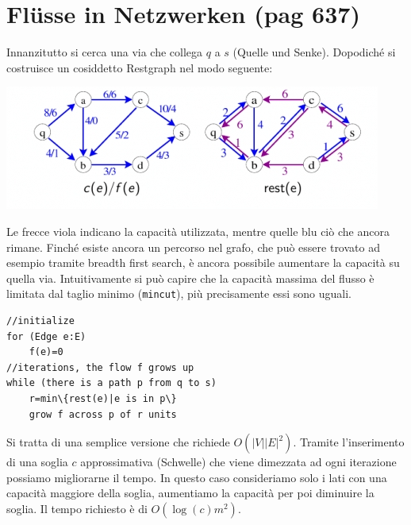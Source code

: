 \documentclass[a4paper]{book}
\newcommand{\inline}[1]{\lstinline!#1!}%
\newcommand{\lstIndent}{4}
\begin{document}
\section{Flüsse in Netzwerken (pag 637)}
Innanzitutto si cerca una via che collega $q$ a $s$ (Quelle und Senke). Dopodiché si costruisce un cosiddetto Restgraph nel modo seguente:
\begin{center}
\includegraphics[scale=0.8]{Figures/restgraph.jpg} 
\end{center}
Le frecce viola indicano la capacità utilizzata, mentre quelle blu ciò che ancora rimane. Finché esiste ancora un percorso nel grafo, che può essere trovato ad esempio tramite breadth first search, è ancora possibile aumentare la capacità su quella via. Intuitivamente si può capire che la capacità massima del flusso è limitata dal taglio minimo (\inline{mincut}), più precisamente essi sono uguali.
\begin{lstlisting}[tabsize=\lstIndent]
//initialize
for (Edge e:E)
	f(e)=0
//iterations, the flow f grows up
while (there is a path p from q to s)
	r=min\{rest(e)|e is in p\}
	grow f across p of r units
\end{lstlisting}
Si tratta di una semplice versione che richiede $O(|V||E|^2)$. Tramite l'inserimento di una soglia $c$ approssimativa (Schwelle) che viene dimezzata ad ogni iterazione possiamo migliorarne il tempo. In questo caso consideriamo solo i lati con una capacità maggiore della soglia, aumentiamo la capacità per poi diminuire la soglia. Il tempo richiesto è di $O(\log (c)m^2)$. 
\end{document}
